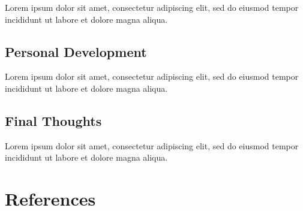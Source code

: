 \documentclass[12pt, a4paper]{article}
\begin{document}
Lorem ipsum dolor sit amet, consectetur adipiscing elit, sed do eiusmod tempor incididunt ut labore et dolore magna aliqua.


\subsection{Personal Development}

Lorem ipsum dolor sit amet, consectetur adipiscing elit, sed do eiusmod tempor incididunt ut labore et dolore magna aliqua.


\subsection{Final Thoughts}

Lorem ipsum dolor sit amet, consectetur adipiscing elit, sed do eiusmod tempor incididunt ut labore et dolore magna aliqua.

\pagebreak


\section{References}


\end{document}
